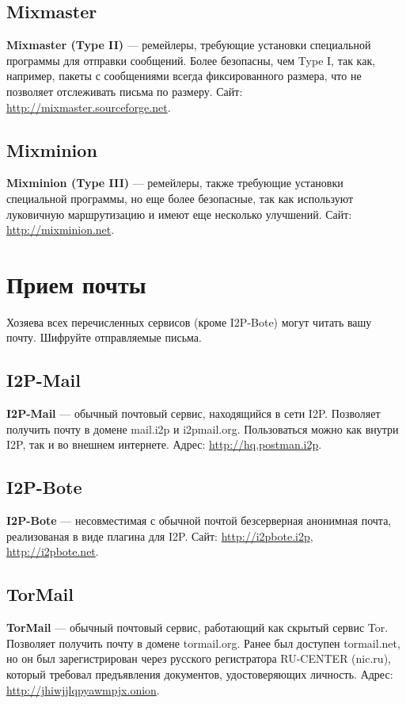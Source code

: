 \subsection{Mixmaster}
\textbf{Mixmaster (Type II)} --- ремейлеры, требующие установки специальной программы для отправки сообщений. Более безопасны, чем Type I, так как, например, пакеты с сообщениями всегда фиксированного размера, что не позволяет отслеживать письма по размеру. Сайт: \url{http://mixmaster.sourceforge.net}.
\subsection{Mixminion}
\textbf{Mixminion (Type III)} --- ремейлеры, также требующие установки специальной программы, но еще более безопасные, так как используют луковичную маршрутизацию и имеют еще несколько улучшений. Сайт: \url{http://mixminion.net}.

\section{Прием почты}
\begin{important}
Хозяева всех перечисленных сервисов (кроме I2P-Bote) могут читать вашу почту. Шифруйте отправляемые письма.
\end{important}
\subsection{I2P-Mail}
\textbf{I2P-Mail} --- обычный почтовый сервис, находящийся в сети I2P. Позволяет получить почту в домене mail.i2p и i2pmail.org. Пользоваться можно как внутри I2P, так и во внешнем интернете. Адрес: \url{http://hq.postman.i2p}.
\subsection{I2P-Bote}
\textbf{I2P-Bote} --- несовместимая с обычной почтой безсерверная анонимная почта, реализованая в виде плагина для I2P. Сайт: \url{http://i2pbote.i2p}, \url{http://i2pbote.net}.
\subsection{TorMail}
\textbf{TorMail} --- обычный почтовый сервис, работающий как скрытый сервис Tor. Позволяет получить почту в домене tormail.org. Ранее был доступен tormail.net, но он был зарегистрирован через русского регистратора RU-CENTER (nic.ru), который требовал предъявления документов, удостоверяющих личность\cite{tormail}. Адрес: \url{http://jhiwjjlqpyawmpjx.onion}.
